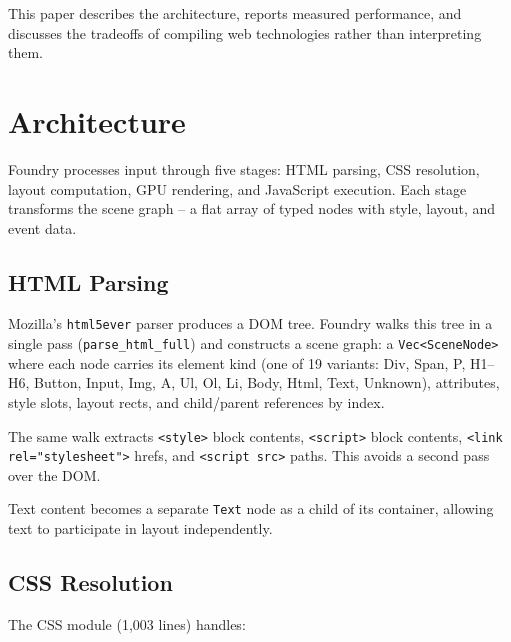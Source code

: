 \documentclass[11pt,twocolumn]{article}
\begin{document}
This paper describes the architecture, reports measured performance, and discusses the tradeoffs of compiling web technologies rather than interpreting them.

\section{Architecture}

Foundry processes input through five stages: HTML parsing, CSS resolution, layout computation, GPU rendering, and JavaScript execution. Each stage transforms the scene graph -- a flat array of typed nodes with style, layout, and event data.

\subsection{HTML Parsing}

Mozilla's \texttt{html5ever} parser produces a DOM tree. Foundry walks this tree in a single pass (\texttt{parse\_html\_full}) and constructs a scene graph: a \texttt{Vec<SceneNode>} where each node carries its element kind (one of 19 variants: Div, Span, P, H1--H6, Button, Input, Img, A, Ul, Ol, Li, Body, Html, Text, Unknown), attributes, style slots, layout rects, and child/parent references by index.

The same walk extracts \texttt{<style>} block contents, \texttt{<script>} block contents, \texttt{<link rel="stylesheet">} hrefs, and \texttt{<script src>} paths. This avoids a second pass over the DOM.

Text content becomes a separate \texttt{Text} node as a child of its container, allowing text to participate in layout independently.

\subsection{CSS Resolution}

The CSS module (1,003 lines) handles:
\end{document}
